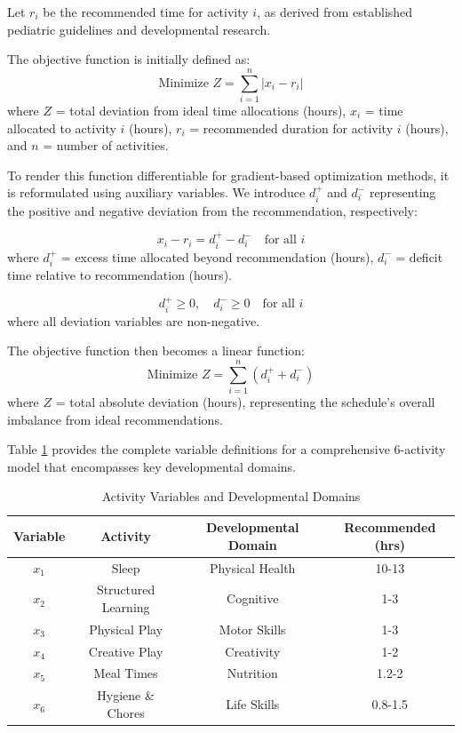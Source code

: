 \documentclass[10pt,conference,compsocconf]{IEEEtran}
\begin{document}
Let $r_i$ be the recommended time for activity $i$, as derived from established pediatric guidelines and developmental research.

The objective function is initially defined as:
\begin{equation}
\text{Minimize } Z = \sum_{i=1}^{n} |x_i - r_i|
\end{equation}
where $Z$ = total deviation from ideal time allocations (hours), $x_i$ = time allocated to activity $i$ (hours), $r_i$ = recommended duration for activity $i$ (hours), and $n$ = number of activities.

To render this function differentiable for gradient-based optimization methods, it is reformulated using auxiliary variables. We introduce $d_i^+$ and $d_i^-$ representing the positive and negative deviation from the recommendation, respectively:

\begin{equation}
x_i - r_i = d_i^+ - d_i^- \quad \text{for all } i
\end{equation}
where $d_i^+$ = excess time allocated beyond recommendation (hours), $d_i^-$ = deficit time relative to recommendation (hours).

\begin{equation}
d_i^+ \geq 0, \quad d_i^- \geq 0 \quad \text{for all } i
\end{equation}
where all deviation variables are non-negative.

The objective function then becomes a linear function:
\begin{equation}
\text{Minimize } Z = \sum_{i=1}^{n} (d_i^+ + d_i^-)
\end{equation}
where $Z$ = total absolute deviation (hours), representing the schedule's overall imbalance from ideal recommendations.

Table \ref{tab:activities} provides the complete variable definitions for a comprehensive 6-activity model that encompasses key developmental domains.

\begin{table}[htbp]
\caption{Activity Variables and Developmental Domains}
\begin{center}
\begin{tabular}{|c|c|c|c|}
\hline
\textbf{Variable} & \textbf{Activity} & \textbf{Developmental Domain} & \textbf{Recommended (hrs)} \\
\hline
$x_1$ & Sleep & Physical Health & 10-13 \\
\hline
$x_2$ & Structured Learning & Cognitive & 1-3 \\
\hline
$x_3$ & Physical Play & Motor Skills & 1-3 \\
\hline
$x_4$ & Creative Play & Creativity & 1-2 \\
\hline
$x_5$ & Meal Times & Nutrition & 1.2-2 \\
\hline
$x_6$ & Hygiene \& Chores & Life Skills & 0.8-1.5 \\
\hline
\end{tabular}
\label{tab:activities}
\end{center}
\end{table}
\end{document}
